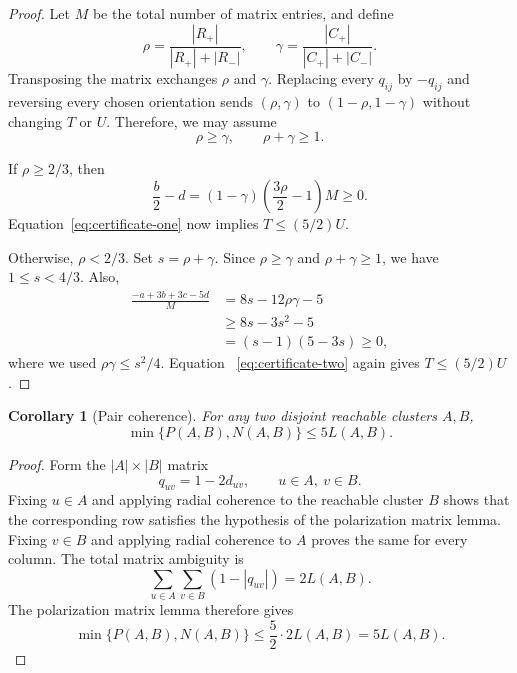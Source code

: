 \documentclass[11pt]{article}
\newtheorem{corollary}[theorem]{Corollary}
\begin{document}
\begin{proof}
Let $M$ be the total number of matrix entries, and define
\[
 \rho=\frac{|R_+|}{|R_+|+|R_-|},
 \qquad
 \gamma=\frac{|C_+|}{|C_+|+|C_-|}.
\]
Transposing the matrix exchanges $\rho$ and $\gamma$.  Replacing every
$q_{ij}$ by $-q_{ij}$ and reversing every chosen orientation sends
$(\rho,\gamma)$ to $(1-\rho,1-\gamma)$ without changing $T$ or $U$.
Therefore, we may assume
\[
  \rho\ge\gamma,
  \qquad
  \rho+\gamma\ge1.
\]

If $\rho\ge2/3$, then
\[
 \frac b2-d
 =(1-\gamma)\left(\frac{3\rho}{2}-1\right)M\ge0.
\]
Equation~\eqref{eq:certificate-one} now implies $T\le(5/2)U$.

Otherwise, $\rho<2/3$.  Set $s=\rho+\gamma$.  Since
$\rho\ge\gamma$ and $\rho+\gamma\ge1$, we have $1\le s<4/3$.  Also,
\begin{align*}
 \frac{-a+3b+3c-5d}{M}
 &=8s-12\rho\gamma-5\\
 &\ge8s-3s^2-5\\
 &=(s-1)(5-3s)\ge0,
\end{align*}
where we used $\rho\gamma\le s^2/4$.  Equation
~\eqref{eq:certificate-two} again gives $T\le(5/2)U$.
\end{proof}

\begin{corollary}[Pair coherence]
For any two disjoint reachable clusters $A,B$,
\[
  \min\{P(A,B),N(A,B)\}\le5L(A,B).
\]
\end{corollary}

\begin{proof}
Form the $|A|\times|B|$ matrix
\[
  q_{uv}=1-2d_{uv},
  \qquad u\in A,\ v\in B.
\]
Fixing $u\in A$ and applying radial coherence to the reachable cluster $B$
shows that the corresponding row satisfies the hypothesis of the
polarization matrix lemma.  Fixing $v\in B$ and applying radial coherence to
$A$ proves the same for every column.  The total matrix ambiguity is
\[
 \sum_{u\in A}\sum_{v\in B}(1-|q_{uv}|)
 =2L(A,B).
\]
The polarization matrix lemma therefore gives
\[
 \min\{P(A,B),N(A,B)\}
 \le\frac52\cdot2L(A,B)=5L(A,B).
\]
\end{proof}
\end{document}
